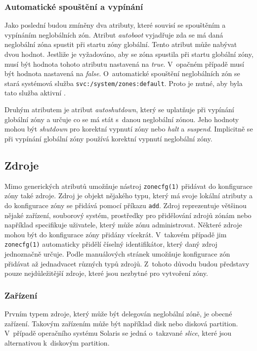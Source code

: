\subsubsection{Automatické spouštění a vypínání}
\label{chapter:zones:configuration:global_attributes:autoboot}
Jako poslední budou zmíněny dva atributy, které souvisí se spouštěním a vypínáním neglobálních zón. Atribut \textit{autoboot} vyjadřuje
zda se má daná neglobální zóna spustit při startu zóny globální. Tento atribut může nabývat dvou hodnot. Jestliže je vyžadováno,
aby se zóna spustila při startu globální zóny, musí být hodnota tohoto atributu nastavená na \textit{true}. V~opačném případě
musí být hodnota nastavená na \textit{false}. O~automatické spouštění neglobálních zón se stará systémová služba \verb|svc:/system/zones:default|.
Proto je nutné, aby byla tato služba aktivní \cite{oracle:manpages:zonecfg}.

Druhým atributem je atribut \textit{autoshutdown}, který se uplatňuje při vypínání globální zóny a určuje co se má stát
s~danou neglobální zónou. Jeho hodnoty mohou být \textit{shutdown} pro korektní vypnutí zóny nebo \textit{halt} a \textit{suspend}.
Implicitně se při vypínání globální zóny používá korektní vypnutí neglobální zóny.
\subsection{Zdroje}
\label{chapter:zones:configuration:resources}
Mimo generických atributů umožňuje nástroj \verb|zonecfg(1)| přidávat do konfigurace zóny také zdroje. Zdroj je objekt
nějakého typu, který má svoje lokální atributy a do konfigurace zóny se přidává pomocí příkazu \verb|add|. Zdroj reprezentuje
většinou nějaké zařízení, souborový systém, prostředky pro přidělování zdrojů zónám nebo například specifikuje uživatele,
který může zónu administrovat. Některé zdroje mohou být do konfigurace zóny přidány vícekrát. V~takovém případě jim \verb|zonecfg(1)|
automaticky přidělí číselný identifikátor, který daný zdroj jednoznačně určuje. Podle manuálových stránek \cite{oracle:manpages:zonecfg}
umožňuje konfigurace zón přidávat až jednadvacet různých typů zdrojů. Z~tohoto důvodu budou představy pouze nejdůležitější 
zdroje, které jsou nezbytné pro vytvoření zóny.
\subsubsection{Zařízení}
\label{chapter:zones:configuration:resources:device}
Prvním typem zdroje, který může být delegován neglobální zóně, je obecné zařízení. Takovým zařízením může být například disk
nebo disková partition. V~případě operačního systému Solaris se jedná o~takzvané \textit{slice}, které jsou alternativou k~diskovým 
partition. 


